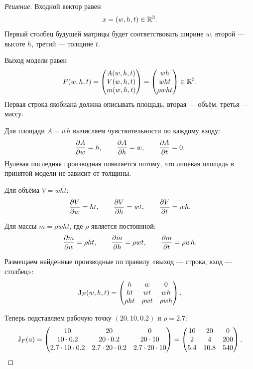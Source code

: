 \begin{proof}[Решение]
Входной вектор равен
\[
x=(w,h,t)\in\mathbb{R}^3.
\]
Первый столбец будущей матрицы будет соответствовать ширине \(w\), второй --- высоте \(h\), третий --- толщине \(t\).

Выход модели равен
\[
F(w,h,t)
=
\begin{pmatrix}
A(w,h,t)\\
V(w,h,t)\\
m(w,h,t)
\end{pmatrix}
=
\begin{pmatrix}
wh\\
wht\\
\rho wht
\end{pmatrix}
\in\mathbb{R}^3.
\]
Первая строка якобиана должна описывать площадь, вторая --- объём, третья --- массу.

Для площади \(A=wh\) вычисляем чувствительности по каждому входу:
\[
\frac{\partial A}{\partial w}=h,
\qquad
\frac{\partial A}{\partial h}=w,
\qquad
\frac{\partial A}{\partial t}=0.
\]
Нулевая последняя производная появляется потому, что лицевая площадь в принятой модели не зависит от толщины.

Для объёма \(V=wht\):
\[
\frac{\partial V}{\partial w}=ht,
\qquad
\frac{\partial V}{\partial h}=wt,
\qquad
\frac{\partial V}{\partial t}=wh.
\]

Для массы \(m=\rho wht\), где \(\rho\) является постоянной:
\[
\frac{\partial m}{\partial w}=\rho ht,
\qquad
\frac{\partial m}{\partial h}=\rho wt,
\qquad
\frac{\partial m}{\partial t}=\rho wh.
\]

Размещаем найденные производные по правилу «выход --- строка, вход --- столбец»:
\begin{equation}
\mathrm{J}_{F}(w,h,t)
=
\begin{pmatrix}
h & w & 0\\
ht & wt & wh\\
\rho ht & \rho wt & \rho wh
\end{pmatrix}.
\label{eq:plate-symbolic-jacobian}
\end{equation}

Теперь подставляем рабочую точку \((20,10,0.2)\) и \(\rho=2.7\):
\[
\mathrm{J}_{F}(a)
=
\begin{pmatrix}
10 & 20 & 0\\
10\cdot0.2 & 20\cdot0.2 & 20\cdot10\\
2.7\cdot10\cdot0.2 & 2.7\cdot20\cdot0.2 & 2.7\cdot20\cdot10
\end{pmatrix}
=
\begin{pmatrix}
10 & 20 & 0\\
2 & 4 & 200\\
5.4 & 10.8 & 540
\end{pmatrix}.
\]


\end{proof}
